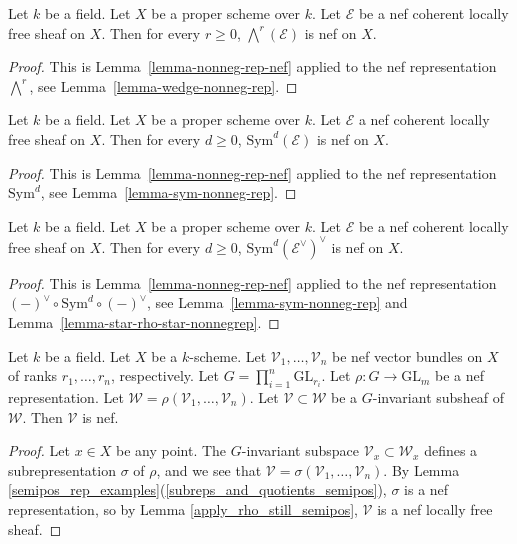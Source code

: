 \begin{lemma}
\label{lemma-wedge-vb-nef}
Let $k$ be a field.
Let $X$ be a proper scheme over $k$.
Let $\mathcal{E}$ be a nef coherent locally free sheaf on $X$.
Then for every $r \geq 0$, $\bigwedge^r(\mathcal{E})$ is nef on $X$.
\end{lemma}

\begin{proof}
This is Lemma~\ref{lemma-nonneg-rep-nef} applied to the nef
representation $\bigwedge^r$, see Lemma~\ref{lemma-wedge-nonneg-rep}.
\end{proof}

\begin{lemma}\label{lemma-sym-vb-nef}
Let $k$ be a field.
Let $X$ be a proper scheme over $k$.
Let $\mathcal{E}$ a nef coherent locally free sheaf on $X$.
Then for every $d \geq 0$, $\mathrm{Sym}^d(\mathcal{E})$ is nef on $X$.
\end{lemma}

\begin{proof}
This is Lemma~\ref{lemma-nonneg-rep-nef} applied to the nef
representation $\mathrm{Sym}^d$, see Lemma~\ref{lemma-sym-nonneg-rep}.
\end{proof}


\begin{lemma}
\label{lemma-star-sym-star-nef}
Let $k$ be a field.
Let $X$ be a proper scheme over $k$.
Let $\mathcal{E}$ be a nef coherent locally free sheaf on $X$.
Then for every $d \geq 0$,
$\mathrm{Sym}^d(\mathcal{E}^\vee)^\vee$ is nef on $X$.
\end{lemma}

\begin{proof}
This is Lemma~\ref{lemma-nonneg-rep-nef} applied to the nef
representation $(-)^\vee \circ \mathrm{Sym}^d \circ (-)^\vee$,
see Lemma~\ref{lemma-sym-nonneg-rep} and
Lemma~\ref{lemma-star-rho-star-nonnegrep}.
\end{proof}

\begin{lemma}
Let $k$ be a field.
Let $X$ be a $k$-scheme.
Let $\mathcal{V}_1,\ldots,\mathcal{V}_n$ be nef vector bundles on $X$
of ranks $r_1,\ldots,r_n$, respectively.
Let $G = \prod_{i=1}^n \mathrm{GL}_{r_i}$.
Let $\rho : G \to \mathrm{GL}_m$ be a nef representation.
Let $\mathcal{W} = \rho(\mathcal{V}_1,\ldots,\mathcal{V}_n)$.
Let $\mathcal{V} \subset \mathcal{W}$ be a $G$-invariant subsheaf of $\mathcal{W}$.
Then $\mathcal{V}$ is nef.
\end{lemma}

\begin{proof}
Let $x\in X$ be any point.
The $G$-invariant subspace $\mathcal{V}_x \subset \mathcal{W}_x$ defines a
subrepresentation $\sigma$ of $\rho$, and we see that
$\mathcal{V} = \sigma(\mathcal{V}_1,\ldots,\mathcal{V}_n)$.
By Lemma \ref{semipos_rep_examples}(\ref{subreps_and_quotients_semipos}),
$\sigma$ is a nef representation, so by Lemma
\ref{apply_rho_still_semipos}, $\mathcal{V}$ is a nef locally free
sheaf.
\end{proof}

